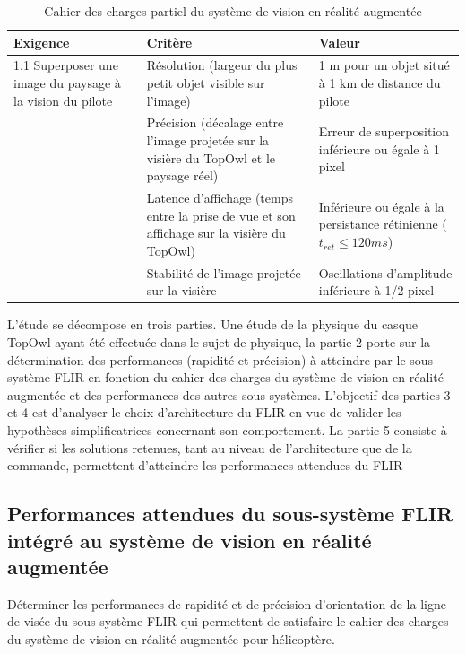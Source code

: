 \begin{table}[!htb]
\begin{center}
\begin{tabular}{|p{}|p{}|p{}|}
\hline 
\textbf{Exigence} & \textbf{Critère} & \textbf{Valeur} \\ 
\hline 
1.1 Superposer une image du paysage à la vision du pilote & Résolution (largeur du plus petit
objet visible sur l'image) & 1 m pour un objet situé à 1 km de
distance du pilote \\ 
\cline{2-3} 
& Précision (décalage entre l'image
projetée sur la visière du TopOwl et
le paysage réel) & Erreur de superposition inférieure
ou égale à 1 pixel\\ 
\cline{2-3}  
 & Latence d'affichage (temps entre la
prise de vue et son affichage sur la
visière du TopOwl) & Inférieure ou égale à la persistance
rétinienne ($t_{ret} \leq 120 ms$) \\ 
\cline{2-3}  
 & Stabilité de l'image projetée sur la
visière & Oscillations d'amplitude inférieure
à 1/2 pixel \\ 
\hline
\end{tabular} 
\caption{Cahier des charges partiel du système de vision en réalité augmentée \label{tab1}}
\end{center}
\end{table}

L'étude se décompose en trois parties. Une étude de la physique du casque TopOwl ayant été effectuée dans
le sujet de physique, la partie 2 porte sur la détermination des performances (rapidité et précision) à atteindre
par le sous-système FLIR en fonction du cahier des charges du système de vision en réalité augmentée et
des performances des autres sous-systèmes. L'objectif des parties 3 et 4 est d'analyser le choix d'architecture du
FLIR en vue de valider les hypothèses simplificatrices concernant son comportement. La partie 5 consiste à
vérifier si les solutions retenues, tant au niveau de l'architecture que de la commande, permettent d'atteindre
les performances attendues du FLIR

\subsection{Performances attendues du sous-système FLIR intégré au système
de vision en réalité augmentée}\label{partie1}

\begin{objectif}
Déterminer les performances de rapidité et de précision d'orientation de la ligne de visée du sous-système
FLIR qui permettent de satisfaire le cahier des charges du système de vision en réalité augmentée
pour hélicoptère.
\end{objectif}

